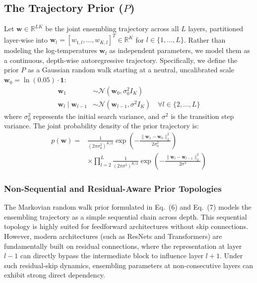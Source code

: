 \subsection{The Trajectory Prior ($P$)}
Let $\mathbf{w} \in \mathbb{R}^{LK}$ be the joint ensembling trajectory across all $L$ layers, partitioned layer-wise into $\mathbf{w}_l = [w_{1, l}, \dots, w_{K, l}]^T \in \mathbb{R}^K$ for $l \in \{1, \dots, L\}$. Rather than modeling the log-temperatures $\mathbf{w}_l$ as independent parameters, we model them as a continuous, depth-wise autoregressive trajectory. 
Specifically, we define the prior $P$ as a Gaussian random walk starting at a neutral, uncalibrated scale $\mathbf{w}_0 = \ln(0.05) \cdot \mathbf{1}$:
\begin{align}
\mathbf{w}_1 &\sim \mathcal{N}(\mathbf{w}_0, \sigma_0^2 I_K) \\
\mathbf{w}_l \mid \mathbf{w}_{l-1} &\sim \mathcal{N}(\mathbf{w}_{l-1}, \sigma^2 I_K) \quad \forall l \in \{2, \dots, L\}
\end{align}
where $\sigma_0^2$ represents the initial search variance, and $\sigma^2$ is the transition step variance. The joint probability density of the prior trajectory is:
\begin{align}
p(\mathbf{w}) = &\frac{1}{(2\pi \sigma_0^2)^{K/2}} \exp\left( -\frac{\|\mathbf{w}_1 - \mathbf{w}_0\|_2^2}{2\sigma_0^2} \right) \nonumber \\
&\times \prod_{l=2}^L \frac{1}{(2\pi \sigma^2)^{K/2}} \exp\left( -\frac{\|\mathbf{w}_l - \mathbf{w}_{l-1}\|_2^2}{2\sigma^2} \right)
\end{align}

\subsubsection{Non-Sequential and Residual-Aware Prior Topologies}
The Markovian random walk prior formulated in Eq.~(6) and Eq.~(7) models the ensembling trajectory as a simple sequential chain across depth. This sequential topology is highly suited for feedforward architectures without skip connections. However, modern architectures (such as ResNets and Transformers) are fundamentally built on residual connections, where the representation at layer $l-1$ can directly bypass the intermediate block to influence layer $l+1$. Under such residual-skip dynamics, ensembling parameters at non-consecutive layers can exhibit strong direct dependency.

